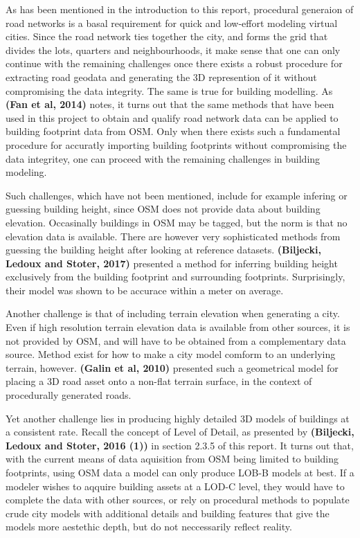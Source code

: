 \documentclass{kththesis}
\begin{document}
As has been mentioned in the introduction to this report, procedural generaion of road networks is a basal requirement for quick and low-effort modeling virtual cities.
Since the road network ties together the city, and forms the grid that divides the lots, quarters and neighbourhoods, it make sense that one can only continue with the remaining challenges once there exists a robust procedure for extracting road geodata and generating the 3D represention of it without compromising the data integrity. 
The same is true for building modelling.
As \textbf{(Fan et al, 2014)} notes, it turns out that the same methods that have been used in this project to obtain and qualify road network data can be applied to building footprint data from OSM. 
Only when there exists such a fundamental procedure for accuratly importing building footprints without compromising the data integritey, one can proceed with the remaining challenges in building modeling.

Such challenges, which have not been mentioned, include for example infering or guessing building height, since OSM does not provide data about building elevation.
Occasinally buildings in OSM may be tagged, but the norm is that no elevation data is available.
There are however very sophisticated methods from guessing the building height after looking at reference datasets.
\textbf{(Biljecki, Ledoux and Stoter, 2017)} presented a method for inferring building height exclusively from the building footprint and surrounding footprints.
Surprisingly, their model was shown to be accurace within a meter on average.

Another challenge is that of including terrain elevation when generating a city.
Even if high resolution terrain elevation data is available from other sources, it is not provided by OSM, and will have to be obtained from a complementary data source.
Method exist for how to make a city model comform to an underlying terrain, however.
\textbf{(Galin et al, 2010)} presented such a geometrical model for placing a 3D road asset onto a non-flat terrain surface, in the context of procedurally generated roads.

Yet another challenge lies in producing highly detailed 3D models of buildings at a consistent rate.
Recall the concept of Level of Detail, as presented by \textbf{(Biljecki, Ledoux and Stoter, 2016 (1))} in section 2.3.5 of this report.
It turns out that, with the current means of data aquisition from OSM being limited to building footprints, using OSM data a model can only produce LOB-B models at best.
If a modeler wishes to aqquire building assets at a LOD-C level, they would have to complete the data with other sources, or rely on procedural methods to populate crude city models with additional details and building features that give the models more aestethic depth, but do not neccessarily reflect reality.
\end{document}
